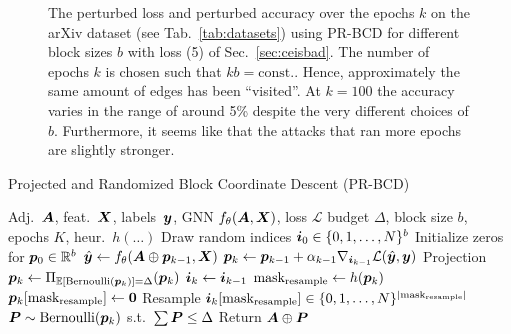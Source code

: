 \documentclass[sigconf,authordraft]{acmart}
\newcommand{\adj}{\mA}
\newcommand{\features}{\mX}
\begin{document}
\begin{figure}[t]
  \centering
  \resizebox{\linewidth}{!}{}
  \caption{The perturbed loss and perturbed accuracy over the epochs \(k\) on the arXiv dataset (see Tab.~\ref{tab:datasets}) using PR-BCD for different block sizes \(b\) with loss (5) of Sec.~\ref{sec:ceisbad}. The number of epochs \(k\) is chosen such that \(k b = \text{const.}\). Hence, approximately the same amount of edges has been ``visited''. At \(k=100\) the accuracy varies in the range of around 5\% despite the very different choices of \(b\). Furthermore, it seems like that the attacks that ran more epochs are slightly stronger.\label{fig:arxivrandomblocksizeinfluence}}
\end{figure}

\begin{algorithm}[h]
  \small
  \caption{Projected and Randomized Block Coordinate Descent (PR-BCD)}
  \label{algo:prbcd}
  \begin{algorithmic}[1]
     Adj.\ \(\adj\), feat.\ \(\features\), labels\ \({\bm{y}}\), GNN \(f_{\theta}(\adj, \features)\), loss \(\mathcal{L}\)
     budget \(\Delta\), block size \(b\), epochs \(K\), heur.\ \(h(\dots)\)
    \STATE Draw random indices \({\bm{i}}_0 \in \{0, 1, \dots, N\}^b\)
    \STATE Initialize zeros for \({\bm{p}}_0 \in \mathbb{R}^b\)
    \STATE \(\hat{\vy} \leftarrow f_{\theta}(\adj \oplus \vp_{k-1}, \features)\)
    \STATE \({\bm{p}}_{k} \leftarrow {\bm{p}}_{k-1} + \alpha_{k-1} \nabla_{{\bm{i}}_{k-1}} \mathcal{L}(\hat{{\bm{y}}}, {\bm{y}})\)
    \STATE Projection \({\bm{p}}_{k} \leftarrow \Pi_{\mathbb{E}[\text{Bernoulli}({\bm{p}}_k)] = \Delta} ({\bm{p}}_{k})\)
    \STATE \({\bm{i}}_{k} \leftarrow {\bm{i}}_{k-1}\)
    \STATE \(\text{mask}_{\text{resample}} \leftarrow h({\bm{p}}_{k})\)
    \STATE \({\bm{p}}_k[\text{mask}_{\text{resample}}] \leftarrow \mathbf{0}\)
    \STATE Resample \({\bm{i}}_{k}[\text{mask}_{\text{resample}}] \in \{0, 1, \dots, N\}^{|\text{mask}_{\text{resample}}|}\)
    \ENDIF
    \ENDFOR
    \STATE \({\bm{P}} \sim \text{Bernoulli}({\bm{p}}_{k})\) s.t.\ \(\sum {\bm{P}} \le \Delta\)
    \STATE Return \(\adj \oplus \mP\)
  \end{algorithmic}
\end{algorithm}
\end{document}
